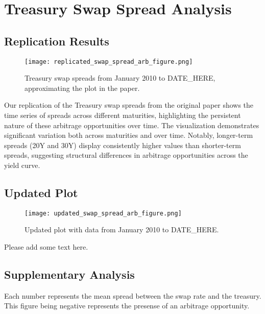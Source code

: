 \documentclass[12pt]{article}
\begin{document}
\section{Treasury Swap Spread Analysis}

\subsection{Replication Results}

\begin{figure}[H]
    \centering
    \texttt{[image: replicated\_swap\_spread\_arb\_figure.png]}
    \caption{Treasury swap spreads from January 2010 to DATE_HERE, approximating the plot in the paper.}
    \label{fig:treasury_swap_spreads_replicated}
\end{figure}

Our replication of the Treasury swap spreads from the original paper shows the time series of spreads across different maturities, highlighting the persistent nature of these arbitrage opportunities over time. The visualization demonstrates significant variation both across maturities and over time. Notably, longer-term spreads (20Y and 30Y) display consistently higher values than shorter-term spreads, suggesting structural differences in arbitrage opportunities across the yield curve.

\subsection{Updated Plot}
\begin{figure}[H]
    \centering
    \texttt{[image: updated\_swap\_spread\_arb\_figure.png]}
    \caption{Updated plot with data from January 2010 to DATE_HERE.}
    \label{fig:treasury_swap_spreads_updated}
\end{figure}

Please add some text here.

\subsection{Supplementary Analysis}

\begin{table}
    \centering
    
    \caption{Each number represents the mean spread between the swap rate and the treasury. This figure being negative represents the presense of an arbitrage opportunity.}
\end{table}
\end{document}
